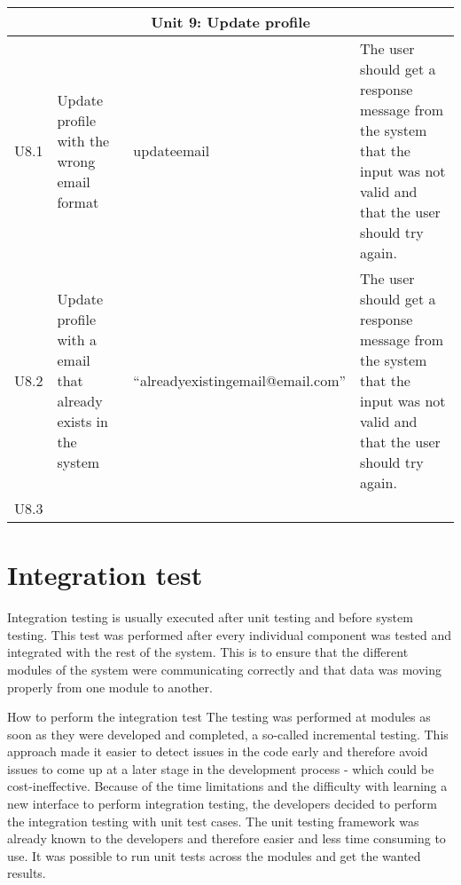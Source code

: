{\begin{longtable}{ | p{1.5cm} | p{6.5cm} | p{3cm} | p{6.5cm} |}
			\multicolumn{4}{c}{Unit 9: Update profile}	\\\hline			
			
			U8.1 & Update profile with the wrong email format  & updateemail  & The user should get a response message from the system that the input was not valid and that the user should try again.   \\ \hline			
			U8.2 & Update profile with a email that already exists in the system  & “alreadyexistingemail\newline @email.com”  & The user should get a response message from the system that the input was not valid and that the user should try again.    \\\hline						
			U8.3 &  &   &  \\ \hline	
			
		\end{longtable}




\section{Integration test}
\label{sec_integration_testing}

Integration testing is usually executed after unit testing and before system testing. This test was performed after every individual component was tested and integrated with the rest of the system. This is to ensure that the different modules of the system were communicating correctly and that data was moving properly from one module to another. \newline

How to perform the integration test\newline
The testing was performed at modules as soon as they were developed and completed, a so-called incremental testing. This approach made it easier to detect issues in the code early and therefore avoid issues to come up at a later stage in the development process - which could be cost-ineffective.
Because of the time limitations and the difficulty with learning a new interface to perform integration testing, the developers decided to perform the integration testing with unit test cases. The unit testing framework was already known to the developers and therefore easier and less time consuming to use. It was possible to run unit tests across the modules and get the wanted results.\newline

}
